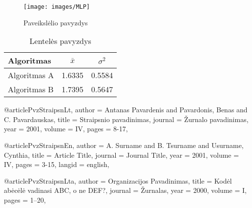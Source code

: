 
\begin{figure}[H]
    \centering
    \texttt{[image: images/MLP]}
    \caption{Paveikslėlio pavyzdys}
    \label{img:mlp}
\end{figure}



\begin{table}[H]\footnotesize
  \centering
  \caption{Lentelės pavyzdys}
  {\begin{tabular}{|l|c|c|} \hline
    Algoritmas & $\bar{x}$ & $\sigma^{2}$ \\
    \hline
    Algoritmas A  & 1.6335    & 0.5584       \\
    Algoritmas B  & 1.7395    & 0.5647       \\
    \hline
  \end{tabular}}
  \label{tab:table example}
\end{table}




@article{PvzStraipsnLt,
    author = {Antanas Pavardenis and Pavardonis, Benas and C. Pavardauskas},
    title = {Straipsnio pavadinimas},
    journal = {Žurnalo pavadinimas},
    year = {2001},
    volume = {IV},
    pages = {8-17},
}

@article{PvzStraipsnEn,
    author = {A. Surname and B. Tsurname and Usurname, Cynthia},
    title = {Article Title},
    journal = {Journal Title},
    year = {2001},
    volume = {IV},
    pages = {3-15},
    langid = {english},
}

@article{PvzStraipsnLta,
    author = {{Organizacijos Pavadinimas}},
    title = {Kodėl abėcėlė vadinasi {ABC}, o ne {DEF}?},
    journal = {Žurnalas},
    year = {2000},
    volume = {I},
    pages = {1--20},
}

